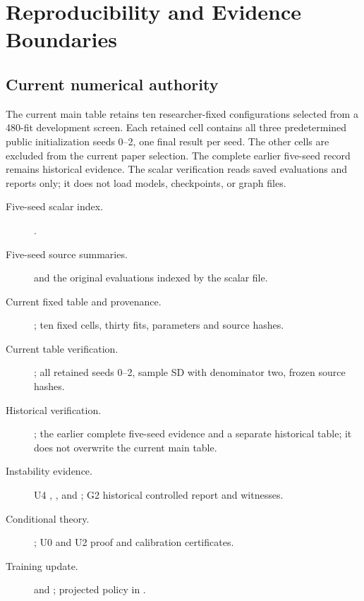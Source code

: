 \chapter{Reproducibility and Evidence Boundaries}\label{app:evidence}
\section{Current numerical authority}
The current main table retains ten researcher-fixed configurations selected from a 480-fit development screen. Each retained cell contains all three predetermined public initialization seeds 0--2, one final result per seed. The other cells are excluded from the current paper selection. The complete earlier five-seed record remains historical evidence. The scalar verification reads saved evaluations and reports only; it does not load models, checkpoints, or graph files.

\begingroup\small\raggedright
\begin{description}
\item[Five-seed scalar index.] .
\item[Five-seed source summaries.]  and the original evaluations indexed by the scalar file.
\item[Current fixed table and provenance.] ; ten fixed cells, thirty fits, parameters and source hashes.
\item[Current table verification.] ; all retained seeds 0--2, sample SD with denominator two, frozen source hashes.
\item[Historical verification.] ; the earlier complete five-seed evidence and a separate historical table; it does not overwrite the current main table.
\item[Instability evidence.] U4 , , and ; G2 historical controlled report and witnesses.
\item[Conditional theory.] ; U0 and U2 proof and calibration certificates.
\item[Training update.]  and ; projected policy in .
\end{description}
\endgroup

